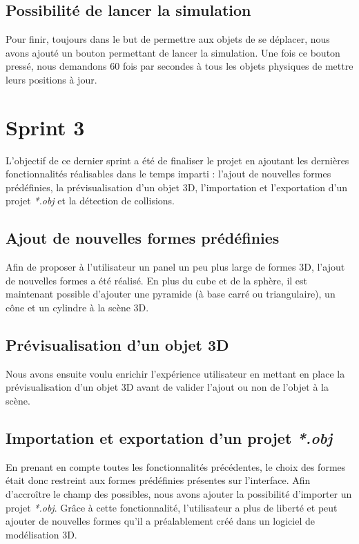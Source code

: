 \documentclass[11pt]{report}
\begin{document}
\subsection{Possibilité de lancer la simulation}

Pour finir, toujours dans le but de permettre aux objets de se déplacer, nous avons ajouté un bouton permettant de lancer la simulation.
Une fois ce bouton pressé, nous demandons 60 fois par secondes à tous les objets physiques de mettre leurs positions à jour.


\section{Sprint 3}

L'objectif de ce dernier sprint a été de finaliser le projet en ajoutant les dernières fonctionnalités réalisables dans le temps imparti : l'ajout de nouvelles formes prédéfinies, la prévisualisation d'un objet 3D, l'importation et l'exportation d'un projet \textit{*.obj} et la détection de collisions. 
\newpage
\subsection{Ajout de nouvelles formes prédéfinies}
Afin de proposer à l'utilisateur un panel un peu plus large de formes 3D, l'ajout de nouvelles formes a été réalisé.
En plus du cube et de la sphère, il est maintenant possible d'ajouter une pyramide (à base carré ou triangulaire), un cône et un cylindre à la scène 3D.


\subsection{Prévisualisation d'un objet 3D}
Nous avons ensuite voulu enrichir l'expérience utilisateur en mettant en place la prévisualisation d'un objet 3D avant de valider l'ajout ou non de l'objet à la scène.


\subsection{Importation et exportation d'un projet \textit{*.obj}}
En prenant en compte toutes les fonctionnalités précédentes, le choix des formes était donc restreint aux formes prédéfinies présentes sur l'interface. Afin d'accroître le champ des possibles, nous avons ajouter la possibilité d'importer un projet \textit{*.obj}. Grâce à cette fonctionnalité, l'utilisateur a plus de liberté et peut ajouter de nouvelles formes qu'il a préalablement créé dans un logiciel de modélisation 3D.\newline
\end{document}

